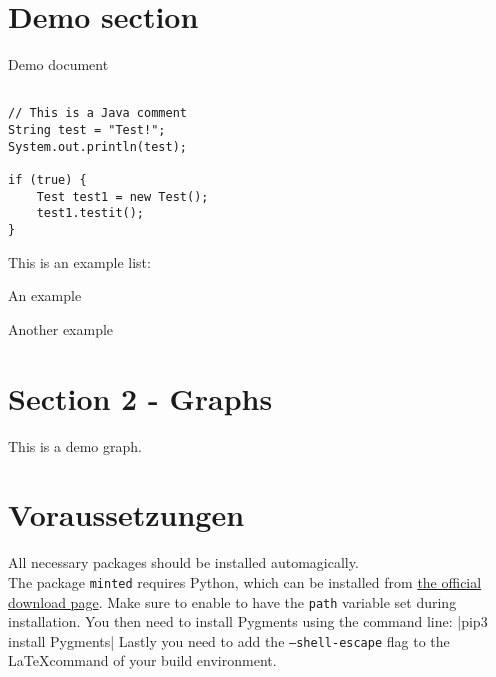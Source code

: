 \documentclass[a4paper,10pt]{article}
\begin{document}
\section*{Demo section}
Demo document

\begin{verbatim}

// This is a Java comment
String test = "Test!";
System.out.println(test);

if (true) {
	Test test1 = new Test();
	test1.testit();
}
\end{verbatim}

This is an example list:

\begin{arrowlist}
\item An example
\item Another example
\end{arrowlist}

\section*{Section 2 - Graphs}
This is a demo graph.


\section*{Voraussetzungen}
All necessary packages should be installed automagically.\\
The package \texttt{minted} requires Python, which can be installed from \href{https://www.python.org/downloads/}{the official download page}. Make sure to enable to have the \texttt{path} variable set during installation. You then need to install Pygments using the command line:
|pip3 install Pygments|
Lastly you need to add the \texttt{--shell-escape} flag to the \LaTeX command of your build environment.
\end{document}
